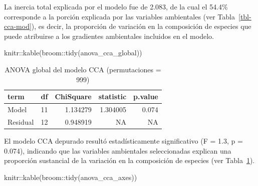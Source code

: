 \documentclass[
  spanish,
  11pt,
  a4paper,
  DIV=11,
  numbers=noendperiod]{scrartcl}
\newenvironment{Shaded}{\begin{snugshade}}{\end{snugshade}}
\newcommand{\FunctionTok}[1]{\textcolor[rgb]{0.28,0.35,0.67}{#1}}
\newcommand{\NormalTok}[1]{\textcolor[rgb]{0.00,0.23,0.31}{#1}}
\newcommand{\SpecialCharTok}[1]{\textcolor[rgb]{0.37,0.37,0.37}{#1}}
\begin{document}
La inercia total explicada por el modelo fue de 2.083, de la cual el
54.4\% corresponde a la porción explicada por las variables ambientales
(ver Tabla~\ref{tbl-cca-mod}), es decir, la proporción de variación en
la composición de especies que puede atribuirse a los gradientes
ambientales incluidos en el modelo.

\begin{Shaded}
\begin{Highlighting}[numbers=left,,]
\NormalTok{knitr}\SpecialCharTok{::}\FunctionTok{kable}\NormalTok{(broom}\SpecialCharTok{::}\FunctionTok{tidy}\NormalTok{(anova\_cca\_global))}
\end{Highlighting}
\end{Shaded}

\begin{longtable}[]{@{}lrrrr@{}}

\caption{\label{tbl-anova-global-cca}ANOVA global del modelo CCA
(permutaciones = 999)}

\tabularnewline

\toprule\noalign{}
term & df & ChiSquare & statistic & p.value \\
\midrule\noalign{}
\endhead
\bottomrule\noalign{}
\endlastfoot
Model & 11 & 1.134279 & 1.304005 & 0.074 \\
Residual & 12 & 0.948919 & NA & NA \\

\end{longtable}

El modelo CCA depurado resultó estadísticamente significativo (F = 1.3,
p = 0.074), indicando que las variables ambientales seleccionadas
explican una proporción sustancial de la variación en la composición de
especies (ver Tabla~\ref{tbl-anova-global-cca}).

\begin{Shaded}
\begin{Highlighting}[numbers=left,,]
\NormalTok{knitr}\SpecialCharTok{::}\FunctionTok{kable}\NormalTok{(broom}\SpecialCharTok{::}\FunctionTok{tidy}\NormalTok{(anova\_cca\_axes))}
\end{Highlighting}
\end{Shaded}
\end{document}
